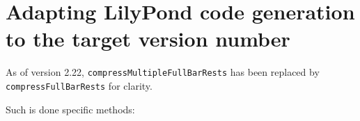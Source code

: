 \section{Adapting LilyPond code generation to the target version number}

As of version 2.22, {\tt compressMultipleFullBarRests} has been replaced by {\tt compressFullBarRests} for clarity.

Such is done specific methods:
\begin{lstlisting}[language=CPlusPlus]

\end{lstlisting}

